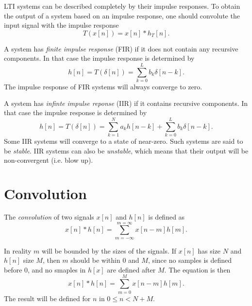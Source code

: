\documentclass[openany]{book}
\def\lsqb{\left[}
\def\rsqb{\right]}
\def\sqb#1{\lsqb #1 \rsqb}
\def\xsig{x\sqb{n}}
\begin{document}
LTI systems can be described completely by their impulse responses. To obtain the output of a system based on an impulse response, one should convolute the input signal with the impulse response
\begin{equation}
    T(\xsig) = \xsig * h_T\sqb{n}.
\end{equation}

A system has \textit{finite impulse response} (FIR) if it does not contain any recursive components. In that case the impulse response is determined by
\begin{equation}
    h\sqb{n} = T(\delta\sqb{n}) = \sum_{k = 0}^L b_k \delta\sqb{n - k}.
\end{equation}
The impulse response of FIR systems will always converge to zero.

A system has \textit{infinte impulse reponse} (IIR) if it contains recursive components. In that case the impulse response is determined by
\begin{equation}
    h\sqb{n} = T(\delta\sqb{n}) = \sum_{k=1}^N a_k h\sqb{n - k} + \sum_{k = 0}^L b_k \delta\sqb{n - k}.
\end{equation}
Some IIR systems will converge to a state of near-zero. Such systems are said to be \textit{stable}. IIR systems can also be \textit{unstable}, which means that their output will be non-convergent (i.e. blow up).

\section{Convolution}
The \textit{convolution} of two signals $\xsig$ and $h\sqb{n}$ is defined as
\begin{equation}
    \xsig * h\sqb{n} = \sum_{m = -\infty}^{m = \infty} x\sqb{n - m}h\sqb{m}.
\end{equation}

In reality $m$ will be bounded by the sizes of the signals. If $\xsig$ has size $N$ and $h\sqb{n}$ size $M$, then $m$ should be within $0$ and $M$, since no samples is defined before $0$, and no smaples in $h\sqb{x}$ are defined after $M$. The equation is then
\begin{equation}
    \xsig * h\sqb{n} = \sum_{m = 0}^{M} x\sqb{n - m}h\sqb{m}.
\end{equation}
The result will be defined for $n$ in $0 \leq n < N + M$.
\end{document}
